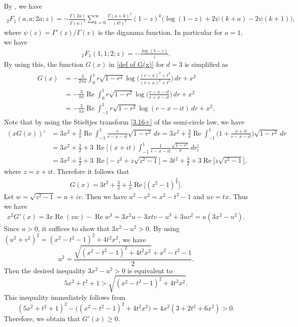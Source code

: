 \documentclass[10pt]{amsart}
\newcommand{\re}{\operatorname{Re}}
\theoremstyle{plain}
\theoremstyle{remark}
\numberwithin{equation}{section}
\begin{document}
By \cite[Eq.(15.8.10)]{NIST}, we have 
\begin{align} \label{hypergeometric in G(x)}
{}_2F_1(a,a;2a;z)= -\frac{ \Gamma(2a) }{\Gamma(a)^4} \sum_{k=0}^\infty \frac{ \Gamma(a+k)^2 }{ (k!)^2 } (1-z)^k \Big( \log(1-z) +2 \psi(k+a)- 2 \psi(k+1) \Big),  
\end{align}
where $\psi(z)=\Gamma'(z)/\Gamma(z)$ is the digamma function. In particular for $a=1$, we have 
\begin{align}
{}_2F_1(1,1;2;z) = - \frac{\log (1-z)}{z}. 
\end{align}
By using this, the function $G(x)$ in \eqref{def of G(x)} for $d=3$ is simplified as 
\begin{align}
\begin{split}
G(x) &  = -\frac{3}{2 \pi x}\int_0^1  r \sqrt{1-r^2} \log \Big(\frac{(r-x)^2+t^2}{(r+x)^2+t^2}\Big) \, dr + x^2
\\
&= -\frac{3}{ \pi x} \re \int_0^1  r \sqrt{1-r^2} \log \Big(\frac{r-x-it}{r+x-it}\Big)\, dr + x^2
\\
&= -\frac{3}{ \pi x} \re \int_{-1}^1  r \sqrt{1-r^2} \log (r-x-it)\, dr + x^2.
\end{split}
\end{align} 
Note that by using the Stieltjes transform \eqref{3.16+} of the semi-circle law, we have 
\begin{align*}
(xG(x))'&= 3x^2 + \frac{3}{\pi}\re \int_{-1}^1 \frac{r}{r-x-it} \sqrt{1-r^2} \,dr  = 3x^2 + \frac{3}{\pi}\re \int_{-1}^1 \Big(1+ \frac{x+it}{r-x-it} \Big) \sqrt{1-r^2} \,dr 
\\
&= 3x^2+ \frac{3}{2} + 3 \,\re \bigg[ (x+it) \int_{-1}^1 \frac{1}{r-x-it} \frac{\sqrt{1-r^2}}{\pi}\,dr \bigg]  
\\
&= 3x^2+ \frac{3}{2} + 3 \,\re \Big[ -z^2+z\sqrt{ z^2-1 }  \Big]  = 3t^2+\frac32 +3 \re \Big[ z \sqrt{z^2-1} \Big],
\end{align*}
where $z=x+it$. 
Therefore it follows that 
\begin{align} \label{G(x) for d=3}
G(x) = 3t^2+\frac32 + \frac{1}{x}  \re \Big[(z^2-1)^{\frac32}\Big] .  
\end{align}
Let $w=\sqrt{z^2-1}=u+iv$. Then we have $u^2-v^2=x^2-t^2-1$ and $uv=tx$. 
Thus we have
\begin{align*}
x^2G'(x) =  3x \re (z w) -\re w^3 =3x^2u-3xtv-u^3+3uv^2 = u(3x^2-u^2). 
\end{align*}
Since $u>0$, it suffices to show that $3x^2-u^2>0$. 
By using $(u^2+v^2)^2= (x^2-t^2-1)^2+ 4 t^2x^2 $, we have 
$$
u^2= \frac{ \sqrt{ (x^2-t^2-1)^2+ 4 t^2x^2} +x^2-t^2-1 }{2}  . 
$$
Then the desired inequality $3x^2-u^2>0$ is equivalent to 
$$
5x^2+t^2+1 > \sqrt{ (x^2-t^2-1)^2+ 4 t^2x^2} . 
$$
This inequality immediately follows from 
$$
(5x^2+t^2+1 )^2-\Big(  (x^2-t^2-1)^2+ 4 t^2x^2 \Big)= 4x^2(3+2t^2+6x^2)>0. 
$$
Therefore, we obtain that $G'(x) \ge 0$. 
\end{document}
